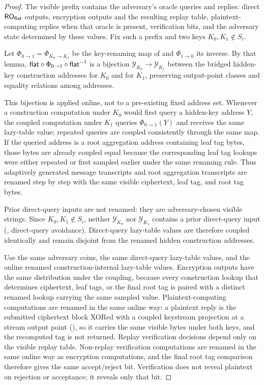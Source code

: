 \begin{proof}
The visible prefix contains the adversary's oracle queries and replies:
direct $\mathsf{RO}_{\mathsf{flat}}$ outputs, encryption outputs and the resulting replay
table, plaintext-computing replies when that oracle is present,
verification bits, and the adversary state determined by these
values. Fix such a prefix and two keys $K_0, K_1 \notin S_i$.

Let $\Phi_{0 \to 1} = \Phi_{K_0 \to K_1}$ be the key-renaming map of
 and $\Phi_{1 \to 0}$ its inverse. By that lemma,
$\mathsf{flat} \circ \Phi_{0 \to 1} \circ \mathsf{flat}^{-1}$ is a bijection
$\mathcal{Y}_{K_0} \to \mathcal{Y}_{K_1}$ between the bridged hidden-key
construction addresses for $K_0$ and for $K_1$, preserving output-point
classes and equality relations among addresses.

This bijection is applied online, not to a pre-existing fixed address
set. Whenever a construction computation under $K_0$ would first query
a hidden-key address $Y$, the coupled computation under $K_1$ queries
$\Phi_{0 \to 1}(Y)$ and receives the same lazy-table value; repeated
queries are coupled consistently through the same map. If the queried
address is a root aggregation address containing leaf tag bytes, those
bytes are already coupled equal because the corresponding leaf tag
lookups were either repeated or first sampled earlier under the same
renaming rule. Thus adaptively generated message transcripts and root
aggregation transcripts are renamed step by step with the same visible
ciphertext, leaf tag, and root tag bytes.

Prior direct-query inputs are not renamed: they are adversary-chosen
visible strings. Since $K_0, K_1 \notin S_i$, neither
$\mathcal{Y}_{K_0}$ nor $\mathcal{Y}_{K_1}$ contains a prior direct-query
input (, direct-query avoidance). Direct-query
lazy-table values are therefore coupled identically and remain disjoint
from the renamed hidden
construction addresses.

Use the same adversary coins, the same direct-query lazy-table values,
and the online renamed construction-internal lazy-table values.
Encryption outputs have the same distribution under the coupling,
because every construction lookup that determines ciphertext, leaf
tags, or the final root tag is paired with a distinct renamed lookup
carrying the same sampled value. Plaintext-computing computations are
renamed in the same online way: a plaintext reply is the submitted
ciphertext block XORed with a coupled keystream projection at a stream
output point (), so it carries the same visible
bytes under both keys, and the recomputed tag is not returned. Replay
verification decisions depend
only on the visible replay table. Non-replay verification computations
are renamed in the same online way as encryption computations, and the
final root tag comparison therefore gives the same accept/reject bit.
Verification does not reveal plaintext on rejection or acceptance; it
reveals only that bit.


\end{proof}
